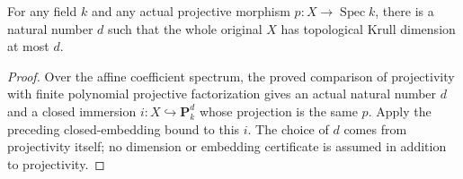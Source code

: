 \begin{theorem}
\label{thm:native-projective-scheme-finite-dimension-bound}
\leanok
For any field $k$ and any actual projective morphism
$p:X\to\operatorname{Spec}k$, there is a natural number $d$ such
that the whole original $X$ has topological Krull dimension at most $d$.
\end{theorem}
\begin{proof}
Over the affine coefficient spectrum, the proved comparison of
projectivity with finite polynomial projective factorization gives
an actual natural number $d$ and a closed immersion
$i:X\hookrightarrow\mathbf P^d_k$ whose projection is the same $p$.
Apply the preceding closed-embedding bound to this $i$.  The choice
of $d$ comes from projectivity itself; no dimension or embedding
certificate is assumed in addition to projectivity.
\end{proof}
